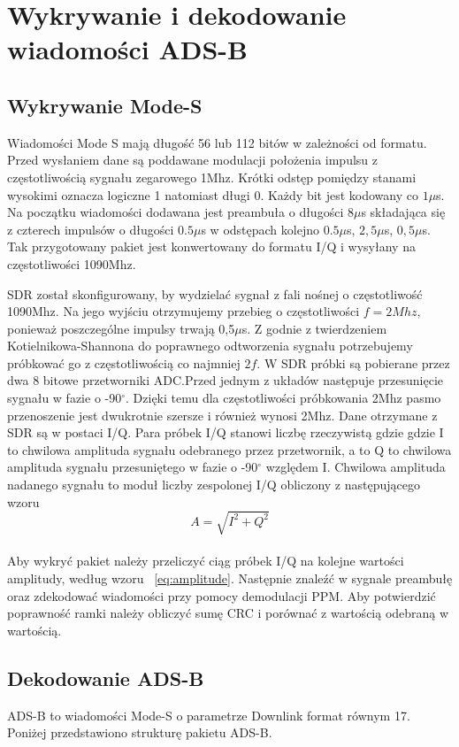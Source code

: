 \documentclass[eng,printmode]{mgr}
\begin{document}
\section{Wykrywanie i dekodowanie wiadomości ADS-B}
\subsection*{Wykrywanie Mode-S}
Wiadomości Mode S mają długość 56 lub 112 bitów w zależności od formatu. Przed wysłaniem dane są poddawane modulacji położenia impulsu z częstotliwością sygnału zegarowego 1Mhz. Krótki odstęp pomiędzy stanami wysokimi oznacza logiczne 1 natomiast długi 0. 
Każdy bit jest kodowany co $1\mu$s. Na początku wiadomości dodawana jest preambuła o długości $8\mu$s składająca się z czterech impulsów o długości $0.5\mu$s w odstępach kolejno $0.5\mu$s, $2,5\mu$s, $0,5\mu$s. Tak przygotowany pakiet jest konwertowany do formatu I/Q i wysyłany na częstotliwości 1090Mhz.


SDR został skonfigurowany, by wydzielać sygnał z fali nośnej o częstotliwość 1090Mhz.
Na jego wyjściu otrzymujemy przebieg o częstotliwości $f=2Mhz$, ponieważ poszczególne impulsy trwają 0,5$\mu$s. Z godnie z twierdzeniem Kotielnikowa-Shannona do poprawnego odtworzenia sygnału potrzebujemy próbkować go z częstotliwością co najmniej $2f$. W SDR próbki są pobierane przez dwa 8 bitowe przetworniki ADC.Przed jednym z układów następuje przesunięcie sygnału w fazie o -90$^\circ$. Dzięki temu dla częstotliwości próbkowania 2Mhz pasmo przenoszenie jest dwukrotnie szersze i również wynosi 2Mhz. Dane otrzymane z SDR są w postaci I/Q. Para próbek I/Q stanowi liczbę rzeczywistą gdzie gdzie I to chwilowa amplituda sygnału odebranego przez przetwornik, a to Q to chwilowa amplituda sygnału przesuniętego w fazie o -90$^\circ$ względem I. Chwilowa amplituda nadanego sygnału to moduł liczby zespolonej I/Q obliczony z następującego wzoru
\\
\begin{equation}
\label{eq:amplitude}
A = \sqrt{I^2 + Q^2}
\end{equation}
\\
Aby wykryć pakiet należy przeliczyć ciąg próbek I/Q na kolejne wartości amplitudy, według wzoru ~\ref{eq:amplitude}. Następnie znaleźć w sygnale preambułę oraz zdekodować wiadomości przy pomocy demodulacji PPM. Aby potwierdzić poprawność ramki należy obliczyć sumę CRC i porównać z wartością odebraną w wartością.
\\

\subsection*{Dekodowanie ADS-B}
ADS-B to wiadomości Mode-S o parametrze Downlink format równym 17. Poniżej przedstawiono strukturę pakietu ADS-B.
\end{document}
